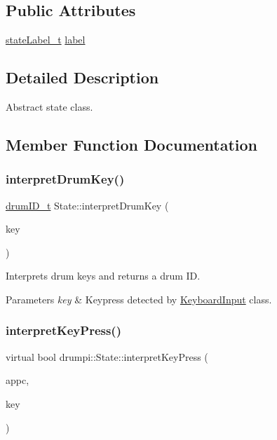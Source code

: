 \subsection*{Public Attributes}
\begin{DoxyCompactItemize}
\item 
\hyperlink{namespacedrumpi_af70ab0854d65f24f7fa353fdc1c46bc9}{state\+Label\+\_\+t} \hyperlink{classdrumpi_1_1State_a6ddcdfba0e31dfb5182a7eaa6563f527}{label}
\end{DoxyCompactItemize}


\subsection{Detailed Description}
Abstract state class. 

\subsection{Member Function Documentation}
\mbox{\label{classdrumpi_1_1State_a39b749a9049a4810935459c82aa42e6d}} 
\subsubsection{\texorpdfstring{interpret\+Drum\+Key()}{interpretDrumKey()}}
{\footnotesize\ttfamily \hyperlink{namespacedrumpi_a3897274035c1b939a604438abe648b1b}{drum\+I\+D\+\_\+t} State\+::interpret\+Drum\+Key (\begin{DoxyParamCaption}\item[{int}]{key }\end{DoxyParamCaption})}

Interprets drum keys and returns a drum ID. 
\begin{DoxyParams}{Parameters}
{\em key} & Keypress detected by \hyperlink{classdrumpi_1_1KeyboardInput}{Keyboard\+Input} class. \\
\hline
\end{DoxyParams}
\mbox{\label{classdrumpi_1_1State_aaa6205d85513b3f717c126e0717e1dbd}} 
\subsubsection{\texorpdfstring{interpret\+Key\+Press()}{interpretKeyPress()}}
{\footnotesize\ttfamily virtual bool drumpi\+::\+State\+::interpret\+Key\+Press (\begin{DoxyParamCaption}\item[{\hyperlink{classdrumpi_1_1ApplicationCallback}{Application\+Callback} $\ast$}]{appc,  }\item[{int}]{key }\end{DoxyParamCaption})\hspace{0.3cm}{\ttfamily [pure virtual]}}

